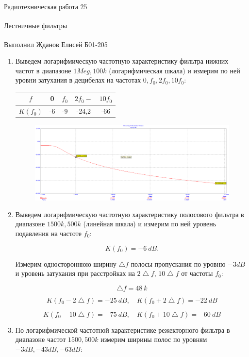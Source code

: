 \documentclass{astroedu-lab}
\begin{document}
\begin{problem}{\huge Радиотехническая работа 25\\\\Лестничные фильтры\\\\Выполнил Жданов Елисей Б01-205}
\begin{enumerate}
\item Выведем логарифмическую частотную характеристику фильтра нижних частот в диапазоне $1Meg,100k$ (логарифмическая шкала) и измерим по ней уровни затухания в децибелах на частотах $0, f_0, 2f_0, 10f_0$:

\begin{center}
\begin{tabular}{|c|c|c|c|c|}
\hline 
$f$ & 0 & $f_0$ & $2f_0-$ & $10f_0$ \\ 
\hline 
$K(f_0)$ & -6 & -9 & -24,2 & -66 \\ 
\hline 
\end{tabular} 
\end{center}

\begin{figure}[!h]
	\centering
	\includegraphics[width=1\textwidth]{2.5.png}
	\label{fig:boiler}
\end{figure}

\item Выведем логарифмическую частотную характеристику полосового фильтра в диапазоне $1500k,500k$ (линейная шкала) и измерим по ней уровень подавления на частоте $f_0$:

\[K(f_0) = -6 \: dB.\]

Измерим одностороннюю ширину $\bigtriangleup f$ полосы пропускания по уровню $-3 dB$ и уровень затухания при расстройках на $2\bigtriangleup f$, $10\bigtriangleup f$ от частоты $f_0$:

\[\bigtriangleup f = 48\: k\]

\[K(f_0 - 2\bigtriangleup f) = -25 \: dB, \quad K(f_0 + 2\bigtriangleup f) = -22 \: dB\]

\[K(f_0 - 10\bigtriangleup f) = -75 \: dB, \quad K(f_0 + 10\bigtriangleup f) = -60 \: dB\]

\item По логарифмической частотной характеристике режекторного фильтра в диапазоне частот $1500,500k$ измерим ширины полос по уровням $-3dB, -43dB, -63dB$:


\end{enumerate}
\end{problem}
\end{document}
